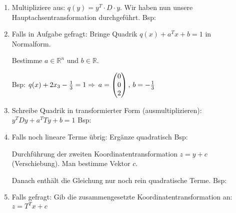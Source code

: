 {\begin{enumerate}[label=\protect\circled{\arabic*}]
\item Multipliziere aus: $q(y) = y^T \cdot D \cdot y$. Wir haben nun unsere Hauptachsentransformation durchgeführt.
\vskip2pt Bsp: \scalebox{0.8}{$y^T D y  = -3y_1^2 - 2y_2^2 + 4y_3^2$}

\item Falls in Aufgabe gefragt: Bringe Quadrik $q(x) + a^T x + b = 1$ in Normalform. \par
Bestimme  $a \in \mathbb{R}^n$ und $b \in \mathbb{R}$. \par
\vskip2pt Bsp: $q(x) + 2x_3 - \frac{1}{3} = 1 \Rightarrow \hskip2pt a = \begin{pmatrix} 0 \\ 0 \\ 2 \end{pmatrix}, \hskip2pt b = -\frac{1}{3}$

\item Schreibe Quadrik in transformierter Form (ausmultiplizieren):  $y^T D y + a^T T y + b = 1$
\vskip2pt Bsp: 

\item Falls noch lineare Terme übrig: Ergänze quadratisch
\vskip2pt Bsp:  \par
{} \par
{}

\vskip3pt

Durchführung der zweiten Koordinatentransformation $z = y + c$ (Verschiebung). Man bestimme Vektor $c$.  \par Danach enthält die Gleichung nur noch rein quadratische Terme.
\vskip2pt Bsp: \scalebox{0.8}{$c = \begin{pmatrix} -1/3 \\ 0 \\ 0 \end{pmatrix} \Longrightarrow Q(z) = -3 z_1^2 - 2z_2^2 + 4 z_3^2$}

\item Falls gefragt: Gib die zusammengesetzte Koordinatentransformation an: $z = T^T x + c$



\end{enumerate}}
